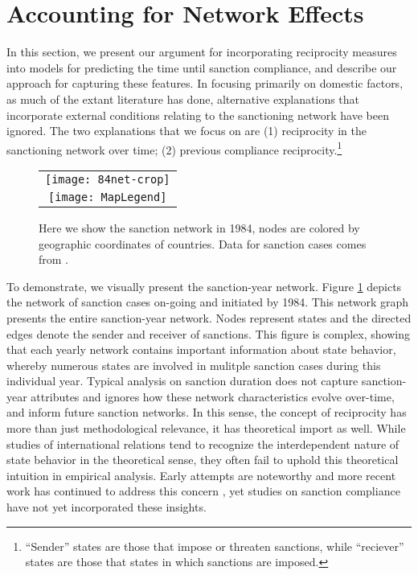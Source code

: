 \section*{Accounting for Network Effects}
\label{neteffects}

In this section, we present our argument for incorporating reciprocity measures into models for predicting the time until sanction compliance, and describe our approach for capturing these features. In focusing primarily on domestic factors, as much of the extant literature has done, alternative explanations that incorporate external conditions relating to the sanctioning network have been ignored. The two explanations that we focus on are (1) reciprocity in the sanctioning network over time; (2) previous compliance reciprocity.\footnote{``Sender'' states are those that impose or threaten sanctions, while ``reciever'' states are those that states in which sanctions are imposed.}

\begin{figure}[ht]
  \centering
  \begin{tabular}{c}
	  \texttt{[image: 84net-crop]} \\
	  \texttt{[image: MapLegend]}
  \end{tabular}
  \caption{Here we show the sanction network in 1984, nodes are colored by geographic coordinates of countries. Data for sanction cases comes from \citet{morgan2009threat}.}
  \label{fig:spaghetti}
\end{figure}
\FloatBarrier

To demonstrate, we visually present the sanction-year network. Figure \ref{fig:spaghetti} depicts the network of sanction cases on-going and initiated by 1984. This network graph presents the entire sanction-year network.  Nodes represent states and the directed edges denote the sender and receiver of sanctions. This figure is complex, showing that each yearly network contains important information about state behavior, whereby numerous states are involved in mulitple sanction cases during this individual year. Typical analysis on sanction duration does not capture sanction-year attributes and ignores how these network characteristics evolve over-time, and inform future sanction networks. In this sense, the concept of reciprocity has more than just methodological relevance, it has theoretical import as well. While studies of international relations tend to recognize the interdependent nature of state behavior in the theoretical sense, they often fail to uphold this theoretical intuition in empirical analysis. Early attempts are noteworthy \citep{keohane1989reciprocity,goldstein1991reciprocity} and more recent work has continued to address this concern \citep{mitchell2001,cranmer2014reciprocity}, yet studies on sanction compliance have not yet incorporated these insights. 

